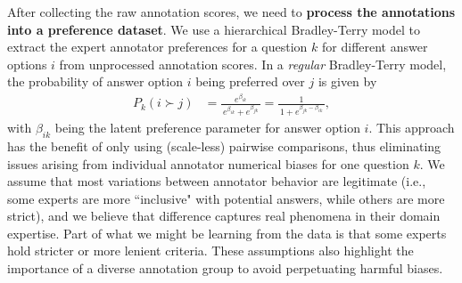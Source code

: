 After collecting the raw annotation scores, we need to \textbf{process the annotations into a preference dataset}.
We use a hierarchical Bradley-Terry model to extract the expert annotator preferences for a question $k$ for different answer options $i$ from unprocessed annotation scores.
In a \textit{regular} Bradley-Terry model, the probability of answer option $i$ being preferred over $j$ is given by
%
\begin{align}
    P_k(i \succ j) 
    &= \frac{e^{\beta_{ik}}}{\,e^{\beta_{ik}} + e^{\beta_{jk}}\,}
    = \frac{1}{\,1 + e^{\beta_{jk} - \beta_{ik}}\,},
    \label{eq:bt-prob}
\end{align}
%
with $\beta_{ik}$ being the latent preference parameter for answer option $i$. 
This approach has the benefit of only using (scale-less) pairwise comparisons, thus eliminating issues arising from individual annotator numerical biases for one question $k$. 
We assume that most variations between annotator behavior are legitimate (i.e., some experts are more ``inclusive" with potential answers, while others are more strict), and we believe that difference captures real phenomena in their domain expertise. 
Part of what we might be learning from the data is that some experts hold stricter or more lenient criteria.
These assumptions also highlight the importance of a diverse annotation group to avoid perpetuating harmful biases.

